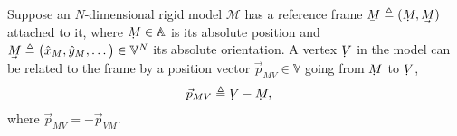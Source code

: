 Suppose an $N$-dimensional rigid model $\mathcal{M}$ has a reference frame $\ubar{M} \triangleq (\udot{M},\uvec{M})$ attached to it, where $\udot{M}\in\mathbb{A}$ is its absolute position and $\uvec{M}\triangleq\big(\hat{x}_{M},\hat{y}_{M},\dots\big)\in\mathbb{V}^N$ its absolute orientation.
%
%
%
%
%
A vertex $\udot{V}$ in the model can be related to the frame by a position vector $\vec{p}_{MV}\in\mathbb{V}$ going from $\udot{M}$ to $\udot{V}$,
%
\begin{align}
\vec{p}_{MV} &\triangleq \udot{V} - \udot{M},\label{eq_position_vector}
\end{align}
%
where $\vec{p}_{MV} = -\vec{p}_{V\!M}$. %
%
%
%
%
%
%
%
%
%
%
%

